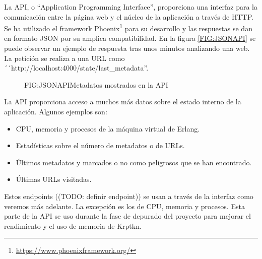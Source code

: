 La API, o ``Application Programming Interface'', proporciona una interfaz para la comunicación entre la página web y el núcleo de la aplicación a través de HTTP. Se ha utilizado el framework Phoenix\footnote{\url{https://www.phoenixframework.org/}} para su desarrollo y las respuestas se dan en formato JSON por su amplica compatibilidad. En la figura \ref{FIG:JSONAPI} se puede observar un ejemplo de respuesta tras unos minutos analizando una web. La petición se realiza a una URL como ´´http://localhost:4000/state/last\_metadata''.

\begin{figure}[jsonapi]{FIG:JSONAPI}{Metadatos mostrados en la API}
\end{figure}

La API proporciona acceso a muchos más datos sobre el estado interno de la aplicación. Algunos ejemplos son:

\begin{itemize}
  \item CPU, memoria y procesos de la máquina virtual de Erlang.
  \item Estadísticas sobre el número de metadatos o de URLs.
  \item Últimos metadatos y marcados o no como peligrosos que se han encontrado.
  \item Últimas URLs visitadas.
\end{itemize}

Estos endpoints ((TODO: definir endpoint)) se usan a través de la interfaz como veremos más adelante. La excepción es los de CPU, memoria y procesos. Esta parte de la API se uso durante la fase de depurado del proyecto para mejorar el rendimiento y el uso de memoria de Krptkn.
